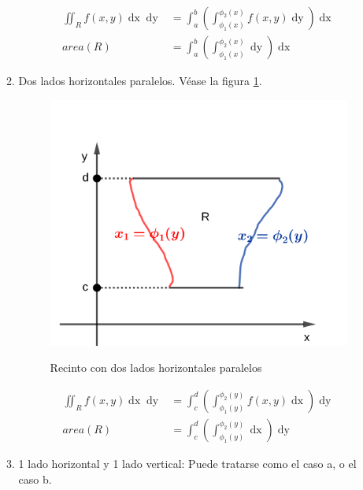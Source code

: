 \documentclass{article}
\begin{document}
\begin{enumerate}[(A)]
\begin{enumerate}
\begin{subequations}
\begin{align}
\iint_R f(x,y) \mathop{dx} \mathop{dy} &= \int_a^b \left( \int_{\phi_1(x)}^{\phi_2(x)} f(x,y) \mathop{dy} \right) \mathop{dx} \\
area(R) &= \int_a^b \left( \int_{\phi_1(x)}^{\phi_2(x)} \mathop{dy} \right) \mathop{dx}
\end{align}
\end{subequations}

\item Dos lados horizontales paralelos. Véase la figura \ref{fig:d2}.

\begin{figure}[ht]
\centering
\caption{Recinto con dos lados horizontales paralelos}
\includegraphics[scale=0.75]{img/integrales/im_d2.png}
\label{fig:d2}
\end{figure}

\begin{subequations}
\begin{align}
\iint_R f(x,y) \mathop{dx} \mathop{dy} &= \int_c^d \left( \int_{\phi_1(y)}^{\phi_2(y)} f(x,y) \mathop{dx} \right) \mathop{dy} \\
area(R) &= \int_c^d \left( \int_{\phi_1(y)}^{\phi_2(y)} \mathop{dx} \right) \mathop{dy}
\end{align}
\end{subequations}

\item 1 lado horizontal y 1 lado vertical: Puede tratarse como el caso a, o el caso b.
\end{enumerate}


\end{enumerate}
\end{document}
